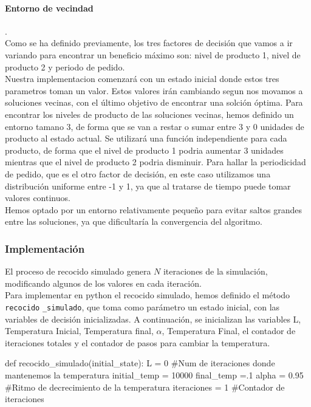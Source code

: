 \documentclass[a4paper,12pt]{article}
\begin{document}
	\paragraph{Entorno de vecindad}.\\	
	
	
	Como se ha definido previamente, los tres factores de decisión que vamos a ir variando para encontrar un beneficio máximo son: nivel de producto 1, nivel de producto 2 y periodo de pedido. \\
	Nuestra implementacion comenzará con un estado inicial donde estos tres parametros toman un valor. Estos valores irán cambiando segun nos movamos a soluciones vecinas, con el último objetivo de 
	encontrar una solción óptima. 
	Para encontrar los niveles de producto de las soluciones vecinas, hemos definido un entorno tamano 3, de forma que se van a restar o sumar entre 3 y 0 unidades de producto al estado actual. Se utilizará una función 
	independiente para cada producto, de forma que el nivel de producto 1 podria aumentar 3 unidades mientras que el nivel de producto 2 podria disminuir. 
	Para hallar la periodicidad de pedido, que es el otro factor de decisión, en este caso utilizamos una distribución uniforme entre -1 y 1, ya que al tratarse de tiempo puede tomar valores continuos. \\
	Hemos optado por un entorno relativamente pequeño para evitar saltos grandes entre las soluciones, ya que dificultaría la convergencia del algoritmo. 
	
	
	
	
	\subsubsection{Implementación}
	El proceso de recocido simulado genera $N$ iteraciones de la simulación, modificando algunos de los valores en cada iteración.\\
	
	Para implementar en python el recocido simulado, hemos definido el método \texttt{recocido} \texttt{\_simulado}, que toma como parámetro un estado inicial, con las variables de  	decisión inicializadas. A continuación, se inicializan las variables L, Temperatura Inicial, Temperatura final, $\alpha$, Temperatura Final, el contador de iteraciones totales y el contador de pasos para cambiar la temperatura. 

	\begin{python}
def recocido_simulado(initial_state):
	L = 0 #Num de iteraciones donde mantenemos la temperatura
	initial_temp = 10000 
	final_temp =.1
	alpha = 0.95 #Ritmo de decrecimiento de la temperatura
	iteraciones = 1 #Contador de iteraciones
	\end{python}
\end{document}
